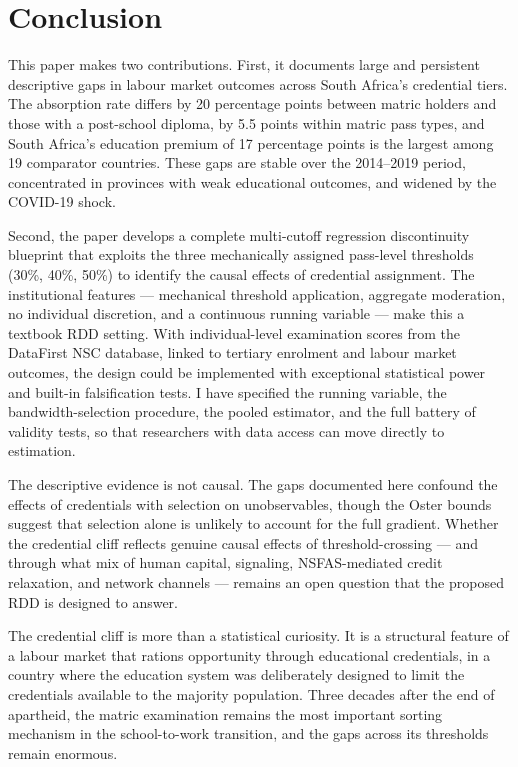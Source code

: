 \documentclass[12pt]{article}
\begin{document}
\section{Conclusion}
\label{sec:conclusion}

This paper makes two contributions. First, it documents large and persistent descriptive gaps in labour market outcomes across South Africa's credential tiers. The absorption rate differs by 20 percentage points between matric holders and those with a post-school diploma, by 5.5 points within matric pass types, and South Africa's education premium of 17 percentage points is the largest among 19 comparator countries. These gaps are stable over the 2014--2019 period, concentrated in provinces with weak educational outcomes, and widened by the COVID-19 shock.

Second, the paper develops a complete multi-cutoff regression discontinuity blueprint that exploits the three mechanically assigned pass-level thresholds (30\%, 40\%, 50\%) to identify the causal effects of credential assignment. The institutional features --- mechanical threshold application, aggregate moderation, no individual discretion, and a continuous running variable --- make this a textbook RDD setting. With individual-level examination scores from the DataFirst NSC database, linked to tertiary enrolment and labour market outcomes, the design could be implemented with exceptional statistical power and built-in falsification tests. I have specified the running variable, the bandwidth-selection procedure, the pooled estimator, and the full battery of validity tests, so that researchers with data access can move directly to estimation.

The descriptive evidence is not causal. The gaps documented here confound the effects of credentials with selection on unobservables, though the Oster bounds suggest that selection alone is unlikely to account for the full gradient. Whether the credential cliff reflects genuine causal effects of threshold-crossing --- and through what mix of human capital, signaling, NSFAS-mediated credit relaxation, and network channels --- remains an open question that the proposed RDD is designed to answer.

The credential cliff is more than a statistical curiosity. It is a structural feature of a labour market that rations opportunity through educational credentials, in a country where the education system was deliberately designed to limit the credentials available to the majority population. Three decades after the end of apartheid, the matric examination remains the most important sorting mechanism in the school-to-work transition, and the gaps across its thresholds remain enormous.
\end{document}
